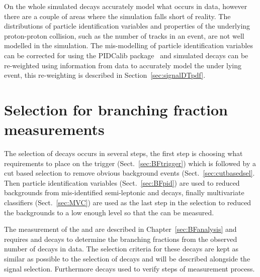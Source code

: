 On the whole simulated decays accurately model what occurs in data, however there are a couple of areas where the simulation falls short of reality.
The distributions of particle identification variables and properties of the underlying proton-proton collision, such as the number of tracks in an event, are not well modelled in the simulation. %
The mis-modelling of particle identification variables can be corrected for using the PIDCalib package~\cite{} and simulated decays can be re-weighted using information from data to accurately model the under lying event, this re-weighting is described in Section~\ref{sec:signalDTpdf}. 


\section{Selection for branching fraction measurements}
\label{sec:BFsel}
The selection of \bmumu decays occurs in several steps, the first step is choosing what requirements to place on the trigger (Sect.~\ref{sec:BFtrigger}) which is followed by a cut based selection to remove obvious background events (Sect.~\ref{sec:cutbasedsel}. Then particle identification variables (Sect.~\ref{sec:BFpid}) are used to reduced backgrounds from mis-identified semi-leptonic and \bhh decays, finally multivariate classifiers (Sect.~\ref{sec:MVC}) are used as the last step in the selection to reduced the backgrounds to a low enough level so that the \bmumu \BFs can be measured.%

The measurement of the \bdmumu and \bsmumu \BFs are described in Chapter~\ref{sec:BFanalysis} and requires \bujpsik and \bhh decays to determine the branching fractions from the observed number of \bmumu decays in data. The selection criteria for these decays are kept as similar as possible to the selection of \bmumu decays and will be described alongside the signal selection. Furthermore \bsjpsiphi decays used to verify steps of measurement process. %


